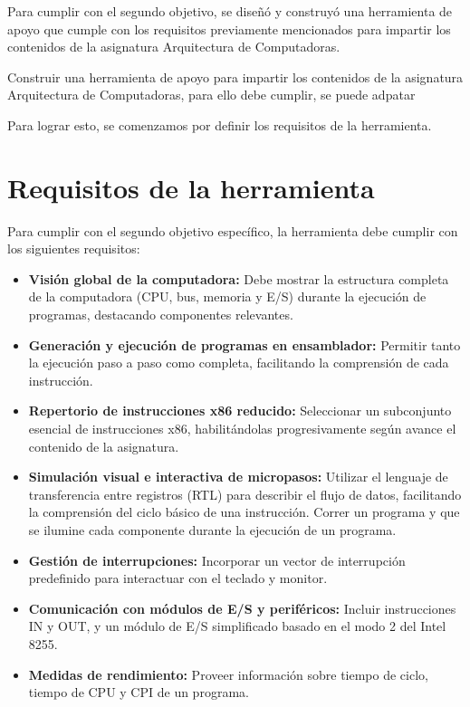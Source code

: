 \documentclass[12pt,twoside]{templates/unerthesis}
\begin{document}
Para cumplir con el segundo objetivo, se diseñó y construyó una herramienta de apoyo que cumple con los requisitos previamente mencionados para impartir los contenidos de la asignatura Arquitectura de Computadoras.

Construir una herramienta de apoyo para impartir los contenidos de la asignatura Arquitectura de Computadoras, para ello debe cumplir, se puede adpatar

Para lograr esto, se comenzamos por definir los requisitos de la herramienta.

\hypertarget{requisitos-de-la-herramienta}{%
\section{Requisitos de la herramienta}\label{requisitos-de-la-herramienta}}

Para cumplir con el segundo objetivo específico, la herramienta debe cumplir con los siguientes requisitos:

\begin{itemize}
\item
  \textbf{Visión global de la computadora:} Debe mostrar la estructura completa de la computadora (CPU, bus, memoria y E/S) durante la ejecución de programas, destacando componentes relevantes.
\item
  \textbf{Generación y ejecución de programas en ensamblador:} Permitir tanto la ejecución paso a paso como completa, facilitando la comprensión de cada instrucción.
\item
  \textbf{Repertorio de instrucciones x86 reducido:} Seleccionar un subconjunto esencial de instrucciones x86, habilitándolas progresivamente según avance el contenido de la asignatura.
\item
  \textbf{Simulación visual e interactiva de micropasos:} Utilizar el lenguaje de transferencia entre registros (RTL) para describir el flujo de datos, facilitando la comprensión del ciclo básico de una instrucción. Correr un programa y que se ilumine cada componente durante la ejecución de un programa.
\item
  \textbf{Gestión de interrupciones:} Incorporar un vector de interrupción predefinido para interactuar con el teclado y monitor.
\item
  \textbf{Comunicación con módulos de E/S y periféricos:} Incluir instrucciones IN y OUT, y un módulo de E/S simplificado basado en el modo 2 del Intel 8255.
\item
  \textbf{Medidas de rendimiento:} Proveer información sobre tiempo de ciclo, tiempo de CPU y CPI de un programa.
\end{itemize}
\end{document}
